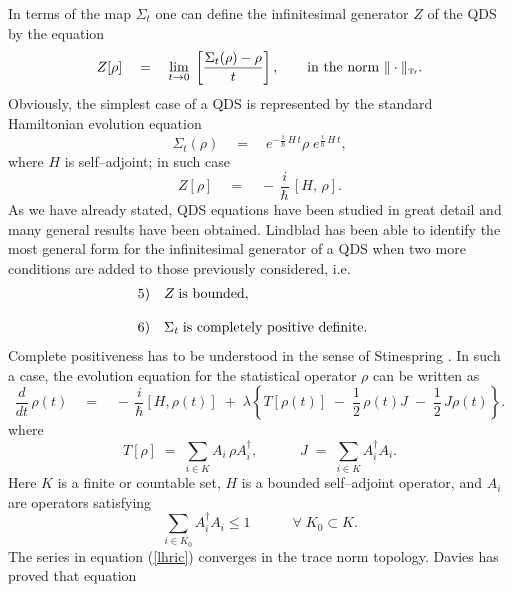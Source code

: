\documentclass[10pt,a4paper]{article}
\begin{document}
In terms of the map $\Sigma_{t}$ one can define the infinitesimal
generator $Z$ of the QDS by the equation
\begin{equation}
Z[\rho] \quad = \quad {\displaystyle \lim_{t\rightarrow 0}}\;
\left[ \frac{\Sigma_{t}(\rho) - \rho}{t} \right], \qquad
\makebox{in the norm $\| \cdot \|_{\makebox{\tiny Tr}}$.}
\end{equation}
Obviously, the simplest case of a QDS is represented by the
standard Hamiltonian evolution equation
\begin{equation}
\Sigma_{t}(\rho) \quad = \quad e^{\displaystyle -
\frac{i}{\hbar}\, H\, t} \rho\;  e^{\displaystyle
\frac{i}{\hbar}\, H\, t},
\end{equation}
where $H$ is self--adjoint; in such case
\begin{equation}
Z[\rho] \quad = \quad -\, \frac{i}{\hbar}\, [H, \,\rho].
\end{equation}
As we have already stated, QDS equations have been studied in
great detail \cite{dav} and many general results have been
obtained. Lindblad \cite{lin} has been able to identify the most
general form for the infinitesimal generator of a QDS when two
more conditions are added to those previously considered, i.e.
\[
\begin{array}{lll}
5) & Z \; \makebox{is bounded}, & \\
& & \\
6) & \Sigma_{t} \; \makebox{is completely positive definite}. &
\end{array}
\]
Complete positiveness has to be understood in the sense of
Stinespring \cite{sti}. In such a case, the evolution equation for
the statistical operator $\rho$ can be written as
\begin{equation} \label{vsqchd}
\frac{d}{dt}\, \rho(t) \quad = \quad -\, \frac{i}{\hbar} [H
,\rho(t)] \; + \; \lambda \left\{ T[\rho(t)] \; - \; \frac{1}{2}\,
\rho(t) J \; - \; \frac{1}{2}\, J \rho(t) \right\}.
\end{equation}
where
\begin{equation} \label{lhric}
T[\rho] \; = \; \sum_{i\in K} A_{i}\, \rho A^{\dagger}_{i},
\qquad\quad J \; = \; \sum_{i\in K} A^{\dagger}_{i} A_{i}.
\end{equation}
Here $K$ is a finite or countable set, $H$ is a bounded
self--adjoint operator, and $A_{i}$ are operators satisfying
\[
\sum_{i\in K_{0}} A^{\dagger}_{i} A_{i} \leq 1 \qquad \quad
\forall\; K_{0}\subset K.
\]
The series in equation (\ref{lhric}) converges in the trace norm
topology. Davies \cite{dav} has proved that equation
\end{document}
